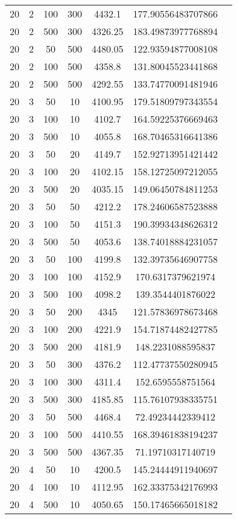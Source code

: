 {\begin{longtabu}{S
S
S
S
S
S[round-mode=places,round-precision=0]
S[round-mode=places,round-precision=0]}
20 & 2 & 100 & 300 & 4432.1 & 177.90556483707866 \\
20 & 2 & 500 & 300 & 4326.25 & 183.49873977768894 \\
20 & 2 & 50 & 500 & 4480.05 & 122.93594877008108 \\
20 & 2 & 100 & 500 & 4358.8 & 131.80045523441868 \\
20 & 2 & 500 & 500 & 4292.55 & 133.74770091481946 \\
20 & 3 & 50 & 10 & 4100.95 & 179.51809797343554 \\
20 & 3 & 100 & 10 & 4102.7 & 164.59225376669463 \\
20 & 3 & 500 & 10 & 4055.8 & 168.70465316641386 \\
20 & 3 & 50 & 20 & 4149.7 & 152.92713951421442 \\
20 & 3 & 100 & 20 & 4102.15 & 158.12725097212055 \\
20 & 3 & 500 & 20 & 4035.15 & 149.06450784811253 \\
20 & 3 & 50 & 50 & 4212.2 & 178.24606587523888 \\
20 & 3 & 100 & 50 & 4151.3 & 190.39934348626312 \\
20 & 3 & 500 & 50 & 4053.6 & 138.74018884231057 \\
20 & 3 & 50 & 100 & 4199.8 & 132.39735646907758 \\
20 & 3 & 100 & 100 & 4152.9 & 170.6317379621974 \\
20 & 3 & 500 & 100 & 4098.2 & 139.3544401876022 \\
20 & 3 & 50 & 200 & 4345 & 121.57836978673468 \\
20 & 3 & 100 & 200 & 4221.9 & 154.71874482427785 \\
20 & 3 & 500 & 200 & 4181.9 & 148.2231088595837 \\
20 & 3 & 50 & 300 & 4376.2 & 112.47737550280945 \\
20 & 3 & 100 & 300 & 4311.4 & 152.6595558751564 \\
20 & 3 & 500 & 300 & 4185.85 & 115.76107938335751 \\
20 & 3 & 50 & 500 & 4468.4 & 72.49234442339412 \\
20 & 3 & 100 & 500 & 4410.55 & 168.39461838194237 \\
20 & 3 & 500 & 500 & 4367.35 & 71.19710317140719 \\
20 & 4 & 50 & 10 & 4200.5 & 145.24444911940697 \\
20 & 4 & 100 & 10 & 4112.95 & 162.33375342176993 \\
20 & 4 & 500 & 10 & 4050.65 & 150.17465665018182 \\

\end{longtabu}}
